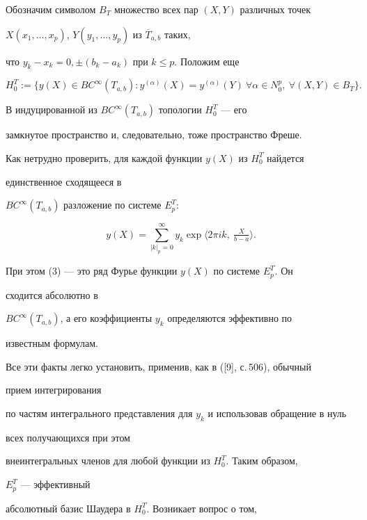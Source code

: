 Обозначим символом $B_T$ множество всех пар $(X,Y)$ различных точек


$X(x_1,\dotsc,x_p)$, $Y(y_1,\dotsc, y_p)$ из $\overline{T}_{a,b}$ таких,


что  $y_k-x_k=0,\pm (b_k-a_k)$ при $k\le p$. Положим еще


$$


H_0^T:=\{y(X)\in


BC^\infty(T_{a,b}):y^{(\alpha)}(X)=y^{(\alpha)}(Y) \ \forall \alpha\in


N_0^p, \ \forall (X,Y)\in B_T\}.


$$





В индуцированной из $BC^\infty(T_{a,b})$ топологии $H^T_0$ --- его


замкнутое пространство и, следовательно, тоже пространство Фреше.





Как нетрудно проверить, для каждой функции $y(X)$ из $H_0^T$ найдется


единственное сходящееся в


$BC^\infty(T_{a,b})$ разложение по системе $E_p^T$:


\begin{equation}


y(X)=\sum_{|k|_p=0}^\infty y_k\exp\big\langle 2\pi ik,\ \tfrac{X}{b-


a}\big\rangle.


\end{equation}


При этом (3) --- это ряд Фурье функции $y(X)$ по системе $E^T_p$. Он


сходится абсолютно в


$BC^\infty(T_{a,b})$, а его коэффициенты $y_k$ определяются эффективно по


известным формулам.


Все эти факты легко установить, применив, как в ([9], с.\,506), обычный


прием интегрирования


по частям интегрального представления для $y_k$ и использовав обращение в нуль


всех получающихся при этом


внеинтегральных членов для любой функции из $H^T_0$. Таким образом,


$E^T_p$ --- эффективный


абсолютный базис Шаудера в $H^T_0$. Возникает вопрос о том,


